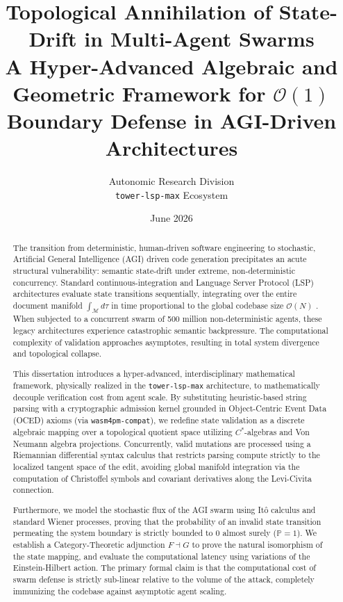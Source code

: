 \documentclass[11pt,a4paper]{report}
\title{Topological Annihilation of State-Drift in Multi-Agent Swarms \\
\large A Hyper-Advanced Algebraic and Geometric Framework for $\mathcal{O}(1)$ Boundary Defense in AGI-Driven Architectures}
\author{Autonomic Research Division \\ \texttt{tower-lsp-max} Ecosystem}
\date{June 2026}
\begin{document}
\begin{abstract}
The transition from deterministic, human-driven software engineering to stochastic, Artificial General Intelligence (AGI) driven code generation precipitates an acute structural vulnerability: semantic state-drift under extreme, non-deterministic concurrency. Standard continuous-integration and Language Server Protocol (LSP) architectures evaluate state transitions sequentially, integrating over the entire document manifold $\int_{\mathcal{M}} d\tau$ in time proportional to the global codebase size $\mathcal{O}(N)$ \cite{berti2019ocel}. When subjected to a concurrent swarm of 500 million non-deterministic agents, these legacy architectures experience catastrophic semantic backpressure. The computational complexity of validation approaches asymptotes, resulting in total system divergence and topological collapse.

This dissertation introduces a hyper-advanced, interdisciplinary mathematical framework, physically realized in the \texttt{tower-lsp-max} architecture, to mathematically decouple verification cost from agent scale. By substituting heuristic-based string parsing with a cryptographic admission kernel grounded in Object-Centric Event Data (OCED) axioms (via \texttt{wasm4pm-compat}), we redefine state validation as a discrete algebraic mapping over a topological quotient space utilizing $C^*$-algebras and Von Neumann algebra projections. Concurrently, valid mutations are processed using a Riemannian differential syntax calculus that restricts parsing compute strictly to the localized tangent space of the edit, avoiding global manifold integration via the computation of Christoffel symbols and covariant derivatives along the Levi-Civita connection.

Furthermore, we model the stochastic flux of the AGI swarm using Itô calculus and standard Wiener processes, proving that the probability of an invalid state transition permeating the system boundary is strictly bounded to $0$ almost surely ($\mathbb{P} = 1$). We establish a Category-Theoretic adjunction $F \dashv G$ to prove the natural isomorphism of the state mapping, and evaluate the computational latency using variations of the Einstein-Hilbert action. The primary formal claim is that the computational cost of swarm defense is strictly sub-linear relative to the volume of the attack, completely immunizing the codebase against asymptotic agent scaling.
\end{abstract}

\maketitle
\tableofcontents








\appendix




\end{document}
